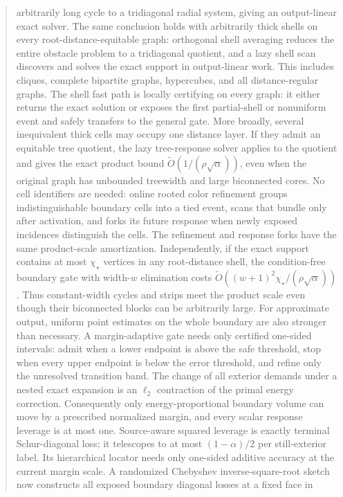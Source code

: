 \documentclass[11pt]{article}
\begin{document}
\begin{abstract}
arbitrarily long cycle to a tridiagonal radial system, giving an output-linear
exact solver.  The same conclusion holds with arbitrarily thick shells on
every root-distance-equitable graph: orthogonal shell averaging reduces the
entire obstacle problem to a tridiagonal quotient, and a lazy shell scan
discovers and solves the exact support in output-linear work.  This includes
cliques, complete bipartite graphs, hypercubes, and all distance-regular
graphs.  The shell fast path is locally certifying on every graph: it either
returns the exact solution or exposes the first partial-shell or nonuniform
event and safely transfers to the general gate.  More broadly, several
inequivalent thick cells may occupy one distance layer.  If they admit an
equitable tree quotient, the lazy tree-response solver applies to the quotient
and gives the exact product bound
$\widetilde O(1/(\rho\sqrt\alpha))$, even when the original graph has
unbounded treewidth and large biconnected cores.  No cell identifiers are
needed: online rooted color refinement groups indistinguishable boundary
cells into a tied event, scans that bundle only after activation, and forks
its future response when newly exposed incidences distinguish the cells.
The refinement and response forks have the same product-scale amortization.
Independently, if the exact
support contains at most
$\chi_\star$ vertices in any root-distance shell, the condition-free boundary
gate with width-$w$ elimination costs
$\widetilde O((w+1)^2\chi_\star/(\rho\sqrt\alpha))$.  Thus constant-width
cycles and strips meet the product scale even though their biconnected blocks
can be arbitrarily large.
For approximate output, uniform point estimates on the whole boundary are
also stronger than necessary.  A margin-adaptive gate needs only certified
one-sided intervals: admit when a lower endpoint is above the safe threshold,
stop when every upper endpoint is below the error threshold, and refine only
the unresolved transition band.  The change of all exterior demands under a
nested exact expansion is an $\ell_2$ contraction of the primal energy
correction.  Consequently only energy-proportional boundary volume can move
by a prescribed normalized margin, and every scalar response leverage is at
most one.  Source-aware squared leverage is exactly terminal Schur-diagonal
loss; it telescopes to at most $(1-\alpha)/2$ per still-exterior label.  Its
hierarchical locator needs only one-sided additive accuracy at the current
margin scale.  A randomized Chebyshev inverse-square-root sketch now
constructs all
exposed boundary diagonal losses at a fixed face in

\end{abstract}
\end{document}
